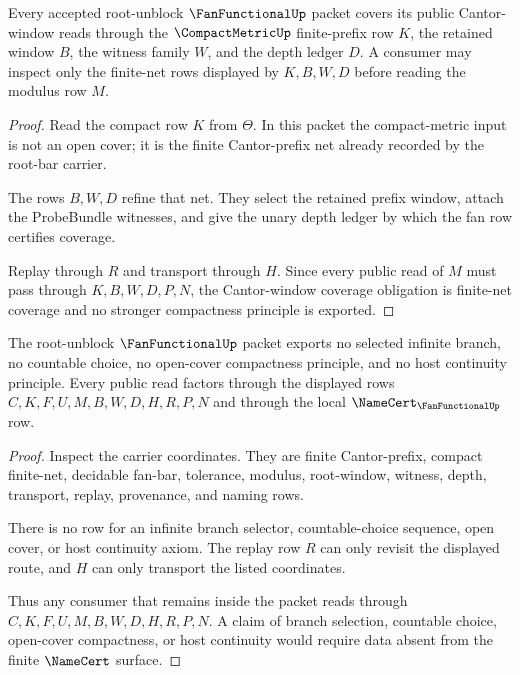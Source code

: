 \begin{theorem}
\label{thm:fanfunctional-cantor-window-coverage-obligations}
Every accepted root-unblock $\FanFunctionalUp$ packet covers its public Cantor-window reads through the $\CompactMetricUp$ finite-prefix row $K$, the retained window $B$, the witness family $W$, and the depth ledger $D$. A consumer may inspect only the finite-net rows displayed by $K,B,W,D$ before reading the modulus row $M$.
\end{theorem}
\begin{proof}
Read the compact row $K$ from $\Theta$. In this packet the compact-metric input is not an open cover; it is the finite Cantor-prefix net already recorded by the root-bar carrier.

The rows $B,W,D$ refine that net. They select the retained prefix window, attach the ProbeBundle witnesses, and give the unary depth ledger by which the fan row certifies coverage.

Replay through $R$ and transport through $H$. Since every public read of $M$ must pass through $K,B,W,D,P,N$, the Cantor-window coverage obligation is finite-net coverage and no stronger compactness principle is exported.
\end{proof}

\begin{theorem}
\label{thm:fanfunctional-choice-free-nonescape-obligations}
The root-unblock $\FanFunctionalUp$ packet exports no selected infinite branch, no countable choice, no open-cover compactness principle, and no host continuity principle. Every public read factors through the displayed rows $C,K,F,U,M,B,W,D,H,R,P,N$ and through the local $\NameCert_{\FanFunctionalUp}$ row.
\end{theorem}
\begin{proof}
Inspect the carrier coordinates. They are finite Cantor-prefix, compact finite-net, decidable fan-bar, tolerance, modulus, root-window, witness, depth, transport, replay, provenance, and naming rows.

There is no row for an infinite branch selector, countable-choice sequence, open cover, or host continuity axiom. The replay row $R$ can only revisit the displayed route, and $H$ can only transport the listed coordinates.

Thus any consumer that remains inside the packet reads through $C,K,F,U,M,B,W,D,H,R,P,N$. A claim of branch selection, countable choice, open-cover compactness, or host continuity would require data absent from the finite $\NameCert$ surface.
\end{proof}

